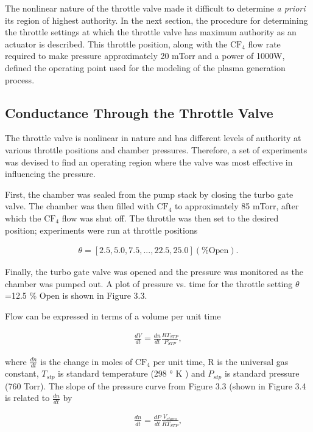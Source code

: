 The nonlinear nature of the throttle valve made it difficult to determine \textit{a priori} its region of highest authority. In the next section, the procedure for determining the throttle settings at which the throttle valve has maximum authority as an actuator is described. This throttle position, along with the $\text{CF}_{4}$ flow rate required to make pressure approximately 20 mTorr and a power of 1000W, defined the operating point used for the modeling of the plasma generation process.

\subsection{Conductance Through the Throttle Valve}

\tab The throttle valve is nonlinear in nature and has different levels of authority at various throttle positions and chamber pressures. Therefore, a set of experiments was devised to find an operating region where the valve was most effective in influencing the pressure.

First, the chamber was sealed from the pump stack by closing the turbo gate valve. The chamber was then filled with $\text{CF}_{4}$ to approximately 85 mTorr, after which the $\text{CF}_{4}$ flow was shut off. The throttle was then set to the desired position; experiments were run at throttle positions

\begin{align}
	\theta = [2.5,5.0,7.5,... , 22.5,25.0] (\% \text{Open}).
\end{align}

\noindent Finally, the turbo gate valve was opened and the pressure was monitored as the chamber was pumped out. A plot of pressure vs. time for the throttle setting $\theta$=12.5 \% Open is shown in Figure 3.3.

Flow can be expressed in terms of a volume per unit time

\begin{align}
	\frac{dV}{dt} = \frac{dn}{dt}\frac{RT_{STP}}{P_{STP}},
\end{align}

\noindent where $\frac{dn}{dt}$ is the change in moles of $\text{CF}_{4}$ per unit time, R is the universal gas constant, $T_{stp}$ is standard temperature (298 ° K ) and $P_{stp}$ is standard pressure (760 Torr). The slope of the pressure curve from Figure 3.3 (shown in Figure 3.4 is related to $\frac{dn}{dt}$ by

\begin{align}
	\frac{dn}{dt} = \frac{dP}{dt}\frac{V_{cham}}{RT_{STP}},
\end{align}

